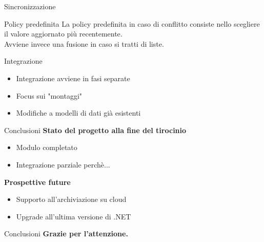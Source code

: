 \documentclass{beamer}
\begin{document}
\begin{darkframes}
\begin{frame}{Sincronizzazione}
    \begin{block}{Policy predefinita}
      La policy predefinita in caso di conflitto consiste nello scegliere il valore aggiornato più recentemente.\\
      Avviene invece una fusione in caso si tratti di liste.
    \end{block}

  \end{frame}

  \begin{frame}{Integrazione}
    \begin{itemize}
      \item Integrazione avviene in fasi separate
      \item Focus sui "montaggi"
      \item Modifiche a modelli di dati già esistenti
    \end{itemize}
  \end{frame}

  \begin{frame}{Conclusioni}
    \textbf{Stato del progetto alla fine del tirocinio}
    \begin{itemize}
      \item Modulo completato
      \item Integrazione parziale perchè...
    \end{itemize}
    \textbf{Prospettive future}
    \begin{itemize}
      \item Supporto all'archiviazione su cloud
      \item Upgrade all'ultima versione di .NET
    \end{itemize}
  \end{frame}

  \begin{frame}{Conclusioni}
    \textbf{Grazie per l'attenzione.}
  \end{frame}

\end{darkframes}
\end{document}
